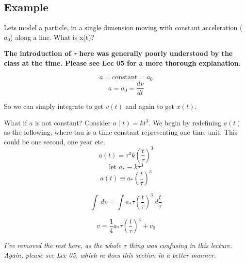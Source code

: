 \subsection{Example}
Lets model a particle, in a single dimension moving with constant acceleration ($a_0$) along a line. What is x(t)?

\textbf{The introduction of $\tau$ here was generally poorly understood by the class at the time. Please see Lec 05 for a more thorough explanation}.

\[
    a = \text{constant} = a_0
\]
\[
    a = a_0 = \frac{dv}{dt}
\]

So we can simply integrate to get $v(t)$ and again to get $x(t)$.

What if $a$ is not constant? Consider $a(t) = k t^3$. We begin by redefining $a(t)$ as the following, where tau is a time constant representing one time unit. This could be one second, one year etc.
\[
    a(t) = \tau^3 k \left(\frac{t}{\tau}\right)^3
\]
\[
    \text{let } a_* \equiv k \tau^3
\]
\[
    a(t) \equiv a_* \left(\frac{t}{\tau}\right)^3
\]

\[
    \int \, dv = \int a_* \tau \left(\frac{t}{\tau}\right)^3 \, d \frac{t}{\tau}
\]

\[
    v = \frac{1}{4} a_* \tau \left(\frac{t}{\tau}\right)^4 + v_0
\]

\emph{I've removed the rest here, as the whole $\tau$ thing was confusing in this lecture. Again, please see Lec 05, which re-does this section in a better manner.}